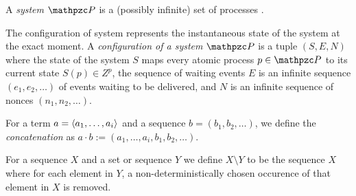 \begin{definition}[Systems]
A \emph{system} $\process$ is a  (possibly infinite) set of processes \aps.
\end{definition}

\begin{definition}[Configurations]
 The configuration of system represents the instantaneous state of the system at the exact moment.
  A \emph{configuration of a system $\process$} is a tuple $(S, E, N)$
  where the state of the system $S$ maps every atomic process  $p\in \process$ to its current state $S(p)\in Z^p$, the sequence of  waiting events $E$ is an infinite sequence $(e_1, e_2, \dots)$ of events waiting to be delivered, and $N$ is an infinite sequence of nonces  $(n_1, n_2, \dots)$.
\end{definition}

\begin{definition}
  For a term $a = \langle a_1, \dots, a_i\rangle$ and a sequence $b = (b_1, b_2,
  \dots)$, we define the \emph{concatenation} as $a \cdot b := (a_1,
  \dots, a_i, b_1, b_2, \dots)$.
  
\end{definition}

\begin{definition}
  For a sequence $X$ and a set or sequence $Y$ we define $X \setminus
  Y$ to be the sequence $X$ where for each element in $Y$, a
  non-deterministically chosen occurence of that element in $X$ is
  removed.
\end{definition}

